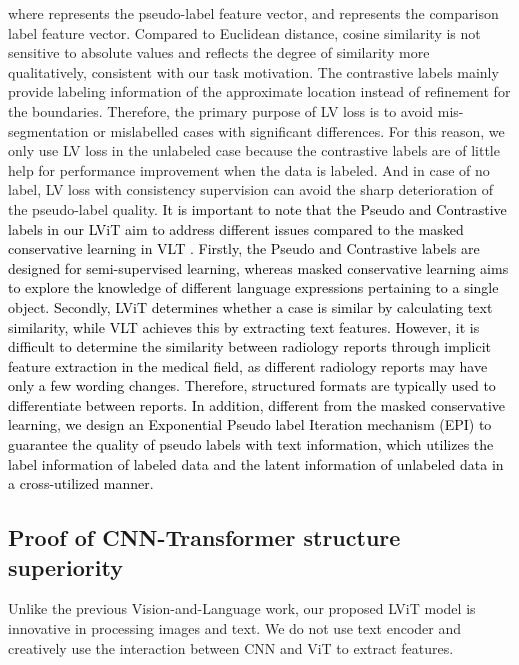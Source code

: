 \documentclass[lettersize,journal]{IEEEtran}
\begin{document}
where  represents the pseudo-label feature vector, and  represents the comparison label feature vector. Compared to Euclidean distance, cosine similarity is not sensitive to absolute values and reflects the degree of similarity more qualitatively, consistent with our task motivation. The contrastive labels mainly provide labeling information of the approximate location instead of refinement for the boundaries. Therefore, the primary purpose of LV loss is to avoid mis-segmentation or mislabelled cases with significant differences. For this reason, we only use LV loss in the unlabeled case because the contrastive labels are of little help for performance improvement when the data is labeled. And in case of no label, LV loss with consistency supervision can avoid the sharp deterioration of the pseudo-label quality.
\textcolor{black}{
It is important to note that the Pseudo and Contrastive labels in our LViT aim to address different issues compared to the masked conservative learning in VLT \cite{Ding22PAMI}. Firstly, the Pseudo and Contrastive labels are designed for semi-supervised learning, whereas masked conservative learning aims to explore the knowledge of different language expressions pertaining to a single object. Secondly, LViT determines whether a case is similar by calculating text similarity, while VLT achieves this by extracting text features. However, it is difficult to determine the similarity between radiology reports through implicit feature extraction in the medical field, as different radiology reports may have only a few wording changes. Therefore, structured formats are typically used to differentiate between reports. In addition, different from the masked conservative learning, we design an Exponential Pseudo label Iteration mechanism (EPI) to guarantee the quality of pseudo labels with text information, which utilizes the label information of labeled data and the latent information of unlabeled data in a cross-utilized manner.}

\subsection{Proof of CNN-Transformer structure superiority}
Unlike the previous Vision-and-Language work, our proposed LViT model is innovative in processing images and text. We do not use text encoder and creatively use the interaction between CNN and ViT to extract features.
\end{document}
